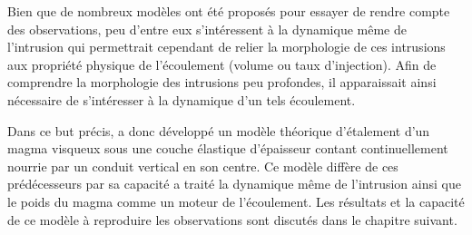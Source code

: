 Bien que de  nombreux modèles ont été proposés pour  essayer de rendre
compte des observations, peu d'entre  eux s'intéressent à la dynamique
même de l'intrusion qui permettrait cependant de relier la morphologie
de ces  intrusions aux propriété  physique de l'écoulement  (volume ou
taux d'injection).   Afin de comprendre la  morphologie des intrusions
peu profondes, il  apparaissait ainsi nécessaire de  s'intéresser à la
dynamique d'un tels écoulement.

Dans ce but précis, \citet{Michaut:2011kg}  a donc développé un modèle
théorique d'étalement  d'un magma  visqueux sous une  couche élastique
d'épaisseur contant continuellement nourrie par un conduit vertical en
son centre.  Ce modèle diffère de  ces prédécesseurs par sa capacité a
traité la  dynamique même de l'intrusion  ainsi que le poids  du magma
comme un  moteur de l'écoulement. Les  résultats et la capacité  de ce
modèle à  reproduire les observations  sont discutés dans  le chapitre
suivant.

\newpage



